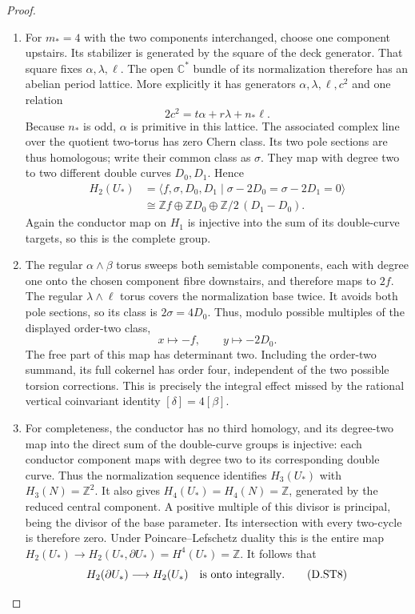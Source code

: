 \begin{proof}
\begin{enumerate}[label=\arabic*.,leftmargin=*]
\item For $m_*=4$ with the two components interchanged, choose one
component upstairs. Its stabilizer is generated by the square
of the deck generator. That square fixes
$\alpha,\lambda,\ell$. The open $\mathbb C^*$ bundle of its
normalization therefore has an abelian period lattice. More
explicitly it has generators $\alpha,\lambda,\ell,c^2$ and one
relation
\[
 2c^2=t\alpha+r\lambda+n_*\ell.
\]
Because $n_*$ is odd, $\alpha$ is primitive in this lattice.
The associated complex line over the quotient two-torus has
zero Chern class. Its two pole sections are thus homologous;
write their common class as $\sigma$. They map with degree two
to two different double curves $D_0,D_1$. Hence
\[
\begin{split}
 H_2(U_*)&=
 \langle f,\sigma,D_0,D_1\mid
                  \sigma-2D_0=\sigma-2D_1=0\rangle\\
 &\cong\mathbb Z f\oplus\mathbb Z D_0
                       \oplus\mathbb Z/2\,(D_1-D_0).
\end{split}                                                 \tag{D.ST7}\label{maps:eq:D.ST7}
\]
Again the conductor map on $H_1$ is injective into the sum of
its double-curve targets, so this is the complete group.

\item The regular $\alpha\wedge\beta$ torus sweeps both semistable
components, each with degree one onto the chosen component
fibre downstairs, and therefore maps to $2f$. The regular
$\lambda\wedge\ell$ torus covers the normalization base twice.
It avoids both pole sections, so its class is $2\sigma=4D_0$.
Thus, modulo possible multiples of the displayed order-two
class,
\[
 x\longmapsto-f,\qquad y\longmapsto-2D_0.
\]
The free part of this map has determinant two. Including the
order-two summand, its full cokernel has order four, independent
of the two possible torsion corrections. This is precisely the
integral effect missed by the rational vertical coinvariant
identity $[\delta]=4[\beta]$.

\item For completeness, the conductor has no third homology, and
its degree-two map into the direct sum of the double-curve
groups is injective: each conductor component maps with degree
two to its corresponding double curve. Thus the normalization
sequence identifies $H_3(U_*)$ with $H_3(N)=\mathbb Z^2$.
It also gives $H_4(U_*)=H_4(N)=\mathbb Z$, generated by the
reduced central component. A positive multiple of this divisor is principal,
being the divisor of the base parameter. Its intersection with
every two-cycle is therefore zero. Under Poincare--Lefschetz
duality this is the entire map
$H_2(U_*)\to H_2(U_*,\partial U_*)=H^4(U_*)=\mathbb Z$.
It follows that
\[
 H_2(\partial U_*)\longrightarrow H_2(U_*)
 \quad\hbox{is onto integrally}.                            \tag{D.ST8}\label{maps:eq:D.ST8}
\]


\end{enumerate}
\end{proof}
